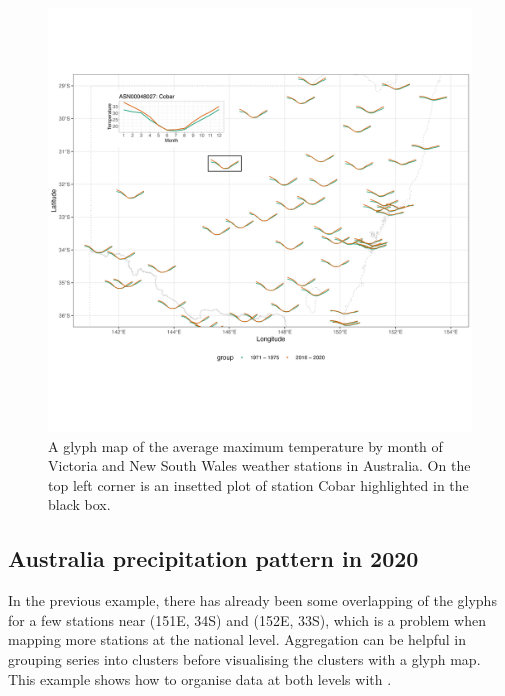 \documentclass[
]{jss}
\begin{document}
\begin{CodeChunk}
\begin{figure}

{\centering \includegraphics[width=1\linewidth,height=0.7\textheight]{../figures/basic-manip} 

}

\caption[A glyph map of the average maximum temperature by month of Victoria and New South Wales weather stations in Australia]{A glyph map of the average maximum temperature by month of Victoria and New South Wales weather stations in Australia. On the top left corner is an insetted plot of station Cobar highlighted in the black box.}\label{fig:basic-manip}
\end{figure}
\end{CodeChunk}

\hypertarget{australia-precipitation-pattern-in-2020}{%
\subsection{Australia precipitation pattern in 2020}\label{australia-precipitation-pattern-in-2020}}

In the previous example, there has already been some overlapping of the glyphs for a few stations near (151E, 34S) and (152E, 33S), which is a problem when mapping more stations at the national level. Aggregation can be helpful in grouping series into clusters before visualising the clusters with a glyph map. This example shows how to organise data at both levels with .
\end{document}
